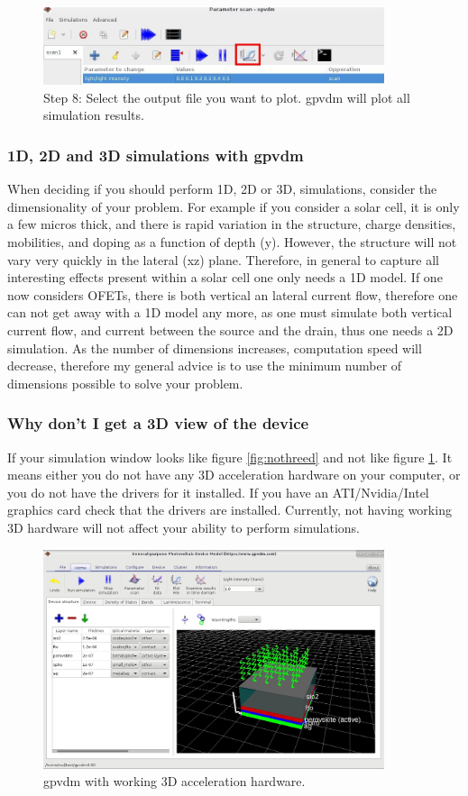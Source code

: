 \documentclass[11pt]{article}
\begin{document}
\begin{figure}[ht!]
\centering
\includegraphics[width=100mm]{./images/7.jpg}
\caption*{Step 8: Select the output file you want to plot.  gpvdm will plot all simulation results.}
\end{figure}

\subsubsection{1D, 2D and 3D simulations with gpvdm}
When deciding if you should perform 1D, 2D or 3D, simulations, consider the dimensionality of your problem.  For example if you consider a solar cell, it is only a few micros thick, and there is rapid variation in the structure, charge densities, mobilities, and doping as a function of depth (y).  However, the structure will not vary very quickly in the lateral (xz) plane.  Therefore, in general  to capture all interesting effects present within a solar cell one only needs a 1D model.  If one now considers OFETs, there is both vertical an lateral current flow, therefore one can not get away with a 1D model any more, as one must simulate both vertical current flow, and current between the source and the drain, thus one needs a 2D simulation.  As the number of dimensions increases, computation speed will decrease, therefore my general advice is to use the minimum number of dimensions possible to solve your problem.

\subsubsection{Why don't I get a 3D view of the device}
If your simulation window looks like figure \ref{fig:nothreed} and not like figure \ref{fig:threed}.  It means  either you do not have any 3D acceleration hardware on your computer, or you do not have the drivers for it installed.  If you have an ATI/Nvidia/Intel graphics card check that the drivers are installed.  Currently, not having working 3D hardware will not affect your ability to perform simulations.

\begin{figure}[ht!]
\centering
\includegraphics[width=100mm]{./images/3d.jpg}
\caption{gpvdm with working 3D acceleration hardware.}
\label{fig:threed}
\end{figure}
\end{document}
